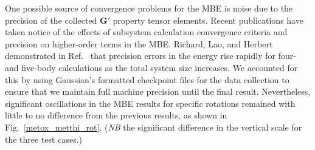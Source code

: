 One possible source of convergence problems for the MBE is noise due to the precision of the collected $\boldsymbol{G'}$ property tensor elements. Recent publications\cite{Richard2014,Liu2017a,Richard2018a} have taken notice of the effects of subsystem calculation convergence criteria and precision on higher-order terms in the MBE. Richard, Lao, and Herbert demonstrated in Ref.~ that precision errors in the energy rise rapidly for four- and five-body calculations as the total system size increases.  We accounted for this by using Gaussian's formatted checkpoint files for the data collection to ensure that we maintain full machine precision until the final result. Nevertheless, significant oscillations in the MBE results for specific rotations remained with little to no difference from the previous results\cite{Mach2014}, as shown in Fig.\ \ref{metox_metthi_rot}.  (\textit{NB} the significant difference in the vertical scale for the three test cases.)
